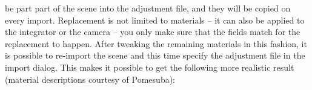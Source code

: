 be part part of the scene into the adjustment file, and they will be copied on every import. Replacement is not limited to materials -- it
can also be applied to the integrator or the camera -- you only make sure that the  fields match for the replacement to happen.
After tweaking the remaining materials in this fashion, it is possible to re-import the scene and this time specify the adjustment file in the import dialog.
This makes it possible to get the following more realistic result (material descriptions courtesy of Pomesuba):
\begin{center}
\end{center}
